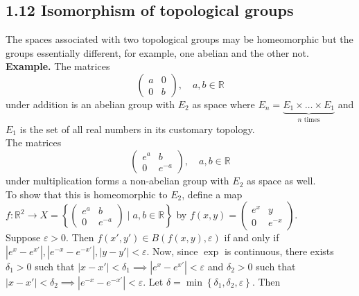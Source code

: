 \documentclass[a4paper]{article}
\theoremstyle{plain}%
\theoremstyle{definition}
\theoremstyle{remark}
\begin{document}
    \subsection*{1.12 \quad Isomorphism of topological groups}
    The spaces associated with two topological groups may be homeomorphic but
    the groups essentially different, for example, one abelian and the other
    not.\\
    \linebreak
    \textbf{Example.} The matrices
    \[
    \begin{pmatrix} 
        a & 0\\
        0 & b
    \end{pmatrix} , \quad a,b \in \mathbb{R}
    \] 
    under addition is an abelian group with $E_2$ as space where
    $E_n = \underbrace{E_1 \times  \ldots \times E_1}_{n\text{ times}}$ and
    $E_1$ is the set of all real numbers in its customary topology.\\
    The matrices
    \[
    \begin{pmatrix} 
        e^{a} & b\\
        0 & e^{-a}
    \end{pmatrix} , \quad a,b \in \mathbb{R}
    \] 
    under multiplication forms a non-abelian group with $E_2$ as space as
    well.\\
    \linebreak
    To show that this is homeomorphic to $E_2$, define a map
    $f  \colon \mathbb{R}^2 \to X = \left\{ 
    \begin{pmatrix} 
        e^{a} & b \\
        0 & e^{-a}
    \end{pmatrix}  \mid a,b \in \mathbb{R} \right\} $ by
    $f(x,y) = \begin{pmatrix} 
        e^{x} & y\\
        0 & e^{-x}
    \end{pmatrix}  $.\\
    \linebreak
    Suppose $\varepsilon > 0$. Then
    $f(x',y') \in B(f(x,y),\varepsilon)$ if and only if
    $\left| e^{x}-e^{x'} \right| , \left| e^{-x}-e^{-x'} \right| ,
    \left| y-y' \right| < \varepsilon$. Now, since
    $\exp$ is continuous, there exists $\delta_1 > 0$ such that
    $\left| x- x' \right| < \delta_1 \implies
    \left| e^{x} - e^{x'} \right| < \varepsilon$ and
    $\delta_2 > 0$ such that $\left| x -x' \right| < \delta_2 \implies
    \left| e^{-x} - e^{-x'} \right| < \varepsilon$. Let
    $\delta = \min \left\{ \delta_1, \delta_2, \varepsilon \right\} $. Then
\end{document}

